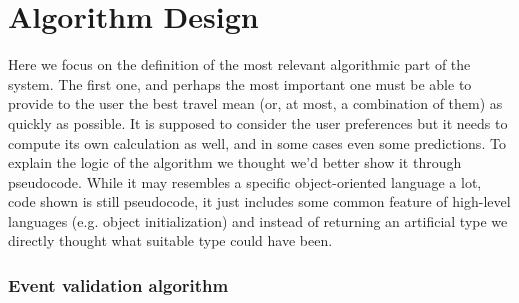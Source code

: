 \chapter{Algorithm Design}
\label{cha:alg}

Here we focus on the definition of the most relevant algorithmic part of the system. The first one, and perhaps the most important one must be able to provide to the user the best travel mean (or, at most, a combination of them) as quickly as possible. It is supposed to consider the user preferences but it needs to compute its own calculation as well, and in some cases even some predictions. To explain the logic of the algorithm we thought we'd better show it through pseudocode. While it may resembles a specific object-oriented language a lot, code shown is still pseudocode, it just includes some common feature of high-level languages (e.g. object initialization) and instead of returning an artificial type we directly thought what suitable type could have been.\subsection*{Event validation algorithm}
